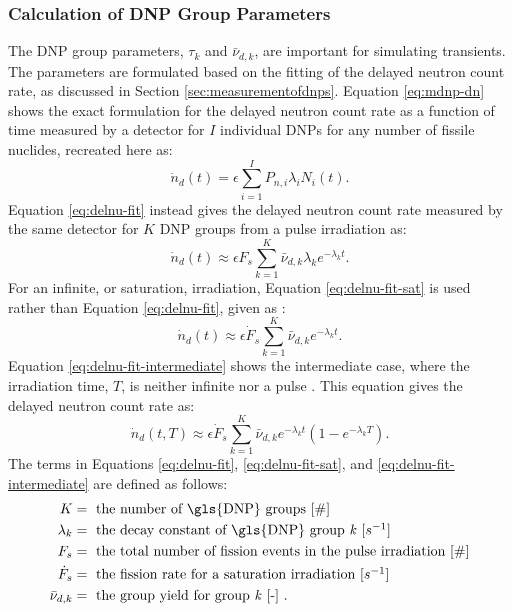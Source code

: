 \subsubsection{Calculation of DNP Group Parameters}
\label{sec:calc-group-param}

The \gls{DNP} group parameters, $\tau_k$ and $\bar{\nu}_{d,k}$, are important for simulating transients.
The parameters are formulated based on the fitting of the delayed neutron count rate, as discussed in Section \ref{sec:measurementofdnps}.
Equation \eqref{eq:mdnp-dn} shows the exact formulation for the delayed neutron count rate as a function of time measured by a detector for $I$ individual \glspl{DNP} for any number of fissile nuclides, recreated here as:
\begin{equation}
\dot{n}_d(t) = \epsilon \sum_{i=1}^{I} P_{n, i} \lambda_i N_{i}(t).
\nonumber
\end{equation}
Equation \eqref{eq:delnu-fit} instead gives the delayed neutron count rate measured by the same detector for $K$ \gls{DNP} groups from a pulse irradiation as:
\begin{equation}
\dot{n}_d(t) \approx \epsilon F_s \sum_{k=1}^{K}  \bar{\nu}_{d, k} \lambda_k e^{-\lambda_k t}.
\label{eq:delnu-fit}
\end{equation}
For an infinite, or saturation, irradiation, Equation \eqref{eq:delnu-fit-sat} is used rather than Equation \eqref{eq:delnu-fit}, given as \cite{brady1988evaluation}:
\begin{equation}
\dot{n}_d(t) \approx \epsilon \dot{F}_s \sum_{k=1}^{K}  \bar{\nu}_{d, k} e^{-\lambda_k t}.
\label{eq:delnu-fit-sat}
\end{equation}
Equation \eqref{eq:delnu-fit-intermediate} shows the intermediate case, where the irradiation time, $T$, is neither infinite nor a pulse \cite{wilson2002delayed}.
This equation gives the delayed neutron count rate as:
\begin{equation}
    \dot{n}_d(t, T) \approx \epsilon \dot{F}_s \sum_{k=1}^{K}  \bar{\nu}_{d, k} e^{-\lambda_k t} \left( 1-e^{-\lambda_kT} \right).
    \label{eq:delnu-fit-intermediate}
\end{equation}
The terms in Equations \eqref{eq:delnu-fit}, \eqref{eq:delnu-fit-sat}, and \eqref{eq:delnu-fit-intermediate} are defined as follows:
\begin{align}
K &= \mbox{ the number of \gls{DNP} groups [$\#$]} \nonumber \\ 
\lambda_k &= \mbox{ the decay constant of \gls{DNP} group \textit{k} [$s^{-1}$] } \nonumber \\ 
F_s &= \mbox{ the total number of fission events in the pulse irradiation [$\#$]} \nonumber \\ 
\dot{F}_s &= \mbox{ the fission rate for a saturation irradiation [$s^{-1}$]} \nonumber \\ 
\bar{\nu}_{d, k} &= \mbox{ the group yield for group \textit{k} [-] .} \nonumber
\end{align}
